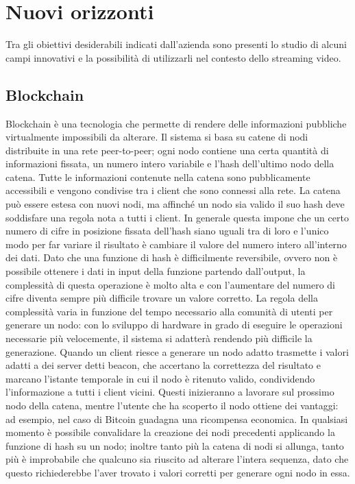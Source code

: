 \section{Nuovi orizzonti}
Tra gli obiettivi desiderabili indicati dall'azienda sono presenti lo studio di alcuni campi innovativi e la possibilità di utilizzarli nel contesto dello streaming video.

	\subsection{Blockchain}
	Blockchain è una tecnologia che permette di rendere delle informazioni pubbliche virtualmente impossibili da alterare. Il sistema si basa su catene di nodi distribuite in una rete peer-to-peer; ogni nodo contiene una certa quantità di informazioni fissata, un numero intero variabile e l'hash dell'ultimo nodo della catena. Tutte le informazioni contenute nella catena sono pubblicamente accessibili e vengono condivise tra i client che sono connessi alla rete. La catena può essere estesa con nuovi nodi, ma affinché un nodo sia valido il suo hash deve soddisfare una regola nota a tutti i client. In generale questa impone che un certo numero di cifre in posizione fissata dell'hash siano uguali tra di loro e l'unico modo per far variare il risultato è cambiare il valore del numero intero all'interno dei dati. Dato che una funzione di hash è difficilmente reversibile, ovvero non è possibile ottenere i dati in input della funzione partendo dall'output, la complessità di questa operazione è molto alta e con l'aumentare del numero di cifre diventa sempre più difficile trovare un valore corretto. La regola della complessità varia in funzione del tempo necessario alla comunità di utenti per generare un nodo: con lo sviluppo di hardware in grado di eseguire le operazioni necessarie più velocemente, il sistema si adatterà rendendo più difficile la generazione. Quando un client riesce a generare un nodo adatto trasmette i valori adatti a dei server detti beacon, che accertano la correttezza del risultato e marcano l'istante temporale in cui il nodo è ritenuto valido, condividendo l'informazione a tutti i client vicini. Questi inizieranno a lavorare sul prossimo nodo della catena, mentre l'utente che ha scoperto il nodo ottiene dei vantaggi: ad esempio, nel caso di Bitcoin guadagna una ricompensa economica. In qualsiasi momento è possibile convalidare la creazione dei nodi precedenti applicando la funzione di hash su un nodo; inoltre tanto più la catena di nodi si allunga, tanto più è improbabile che qualcuno sia riuscito ad alterare l'intera sequenza, dato che questo richiederebbe l'aver trovato i valori corretti per generare ogni nodo in essa.
